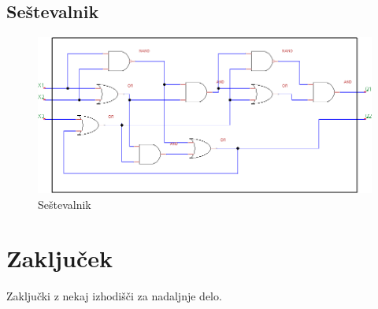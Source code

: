 \documentclass[seminar, slovene]{FRIreport}
\begin{document}
\subsection{Seštevalnik}
\begin{figure}[htb]
\includegraphics[width=14cm]{vezja/img/sestevalnik.png}
\caption{Seštevalnik}
\label{sestevalnik}
\end{figure}
\pagebreak

%
\section{Zaključek}
Zaključki z nekaj izhodišči za nadaljnje delo.

%
\References


\end{document}
